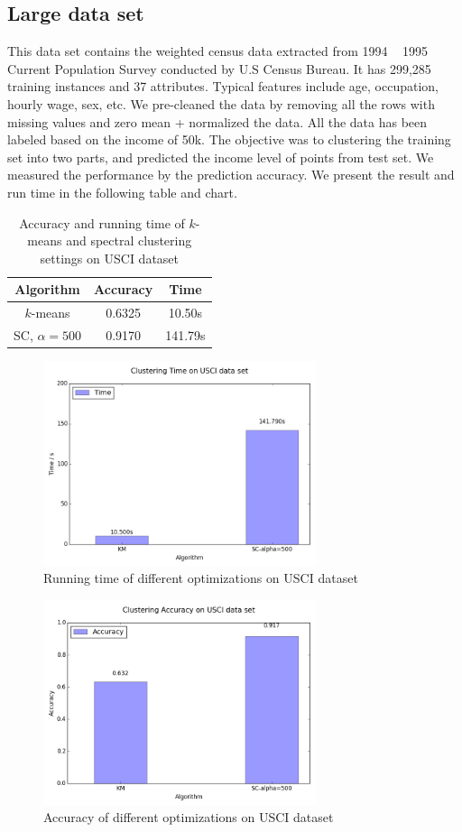 \documentclass{acm_proc_article-sp}
\begin{document}
\subsection{Large data set}
This data set contains the weighted census data extracted from 1994 ~ 1995 Current Population Survey conducted by U.S Census Bureau. It has 299,285 training instances and 37 attributes. Typical features include age, occupation, hourly wage, sex, etc. We pre-cleaned the data by removing all the rows with missing values and zero mean + normalized the data. All the data has been labeled based on the income of 50k. The objective was to clustering the training set into two parts, and predicted the income level of points from test set. We measured the performance by the prediction accuracy.
We present the result and run time in the following table and chart.

\begin{table}
\centering
\begin{tabular}{|c|cc|}
\hline
Algorithm & Accuracy & Time \\
\hline
 $k$-means & 0.6325 & 10.50s\\
 SC, $\alpha=500$ & 0.9170 & 141.79s\\
 \hline
\end{tabular}
\caption{Accuracy and running time of $k$-means and spectral clustering settings on USCI dataset}
\label{table_usci}
\end{table}

\begin{figure}
\centering
\includegraphics[height=6cm]{ut.png}
\caption{Running time of different optimizations on USCI dataset}
\label{figure_musk_time}
\end{figure}

\begin{figure}
\centering
\includegraphics[height=6cm]{ua.png}
\caption{Accuracy of different optimizations on USCI dataset}
\label{figure_musk_accu}
\end{figure}
\end{document}
